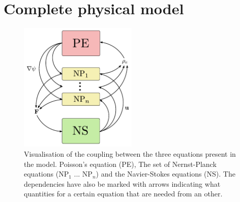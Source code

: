 \section{Complete physical model}

\begin{figure}\label{fig:coupling}
\begin{center}
\includegraphics[width=0.5\textwidth]{fig/coupling.pdf}
\end{center}
\caption{Visualisation of the coupling between the three equations
  present in the model. Poisson's equation (PE), The set of
  Nernst-Planck equations (NP$_1$ ... NP$_n$) and the Navier-Stokes
  equations (NS). The dependencies have also be marked with arrows
  indicating what quantities for a certain equation that are needed
  from an other.}
\end{figure}
